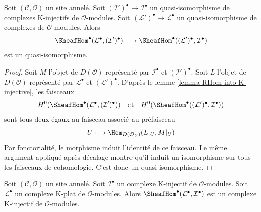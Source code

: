 \begin{lemma}
\label{lemma-RHom-well-defined}
Soit $(\mathcal{C}, \mathcal{O})$ un site annelé. Soit
$(\mathcal{I}')^\bullet \to \mathcal{I}^\bullet$
un quasi-isomorphisme de complexes K-injectifs de $\mathcal{O}$-modules.
Soit $(\mathcal{L}')^\bullet \to \mathcal{L}^\bullet$
un quasi-isomorphisme de complexes de $\mathcal{O}$-modules.
Alors
$$
\SheafHom^\bullet(\mathcal{L}^\bullet, (\mathcal{I}')^\bullet)
\longrightarrow
\SheafHom^\bullet((\mathcal{L}')^\bullet, \mathcal{I}^\bullet)
$$
est un quasi-isomorphisme.
\end{lemma}

\begin{proof}
Soit $M$ l'objet de $D(\mathcal{O})$ représenté par
$\mathcal{I}^\bullet$ et $(\mathcal{I}')^\bullet$.
Soit $L$ l'objet de $D(\mathcal{O})$ représenté par
$\mathcal{L}^\bullet$ et $(\mathcal{L}')^\bullet$.
D'après le lemme \ref{lemma-RHom-into-K-injective},
les faisceaux
$$
H^0(\SheafHom^\bullet(\mathcal{L}^\bullet, (\mathcal{I}')^\bullet))
\quad\text{et}\quad
H^0(\SheafHom^\bullet((\mathcal{L}')^\bullet, \mathcal{I}^\bullet))
$$
sont tous deux égaux au faisceau associé au préfaisceau
$$
U \longmapsto \Hom_{D(\mathcal{O}_U)}(L|_U, M|_U)
$$
Par fonctorialité, le morphisme induit l'identité de ce faisceau.
Le même argument appliqué après décalage montre qu'il induit un
isomorphisme sur tous les faisceaux de cohomologie. C'est donc un quasi-isomorphisme.
\end{proof}

\begin{lemma}
\label{lemma-RHom-from-K-flat-into-K-injective}
Soit $(\mathcal{C}, \mathcal{O})$ un site annelé. Soit $\mathcal{I}^\bullet$
un complexe K-injectif de $\mathcal{O}$-modules. Soit
$\mathcal{L}^\bullet$ un complexe K-plat de $\mathcal{O}$-modules.
Alors $\SheafHom^\bullet(\mathcal{L}^\bullet, \mathcal{I}^\bullet)$
est un complexe K-injectif de $\mathcal{O}$-modules.
\end{lemma}

